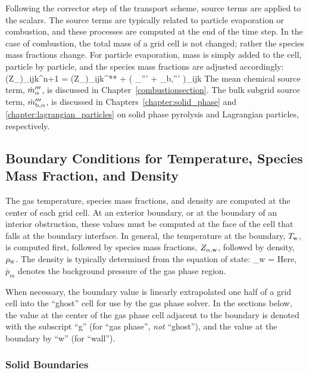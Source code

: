 Following the corrector step of the transport scheme, source terms are applied to the scalars.  The source terms are typically related to particle evaporation or combustion, and these processes are computed at the end of the time step. In the case of combustion, the total mass of a grid cell is not changed; rather the species mass fractions change. For particle evaporation, mass is simply added to the cell, particle by particle, and the species mass fractions are adjusted accordingly:
\be \label{eq:mass_source_terms}
   (\rho Z_\alpha)_{ijk}^{n+1} = (\rho Z_\alpha)_{ijk}^{**} + \dt \left( \dm_{\alpha}''' + \dm_{\rm b,\alpha}''' \right)_{ijk}
\ee
The mean chemical source term, $\dot{m}_{\alpha}'''$, is discussed in Chapter~\ref{combustionsection}.  The bulk subgrid source term, $\dot{m}_{\rm b,\alpha}'''$, is discussed in Chapters~\ref{chapter:solid_phase} and \ref{chapter:lagrangian_particles} on solid phase pyrolysis and Lagrangian particles, respectively.


\subsection{Boundary Conditions for Temperature, Species Mass Fraction, and Density}
\label{section:TZD_bc}

The gas temperature, species mass fractions, and density are computed at the center of each grid cell. At an exterior boundary, or at
the boundary of an interior obstruction, these values must be computed at the face of the cell that falls at the boundary interface. In general, the temperature at the boundary, $T_{\rm w}$, is computed first, followed by species mass fractions, $Z_{\rm \alpha,w}$, followed by density, $\rho_{\rm w}$. The density is typically determined from the equation of state:
\be  \rho_{\rm w} =   \ee
Here, $\overline{p}_m$ denotes the background pressure of the gas phase region.

When necessary, the boundary value is linearly extrapolated one half of a grid cell into the ``ghost'' cell for use by the gas phase solver. In the sections below, the value at the center of the gas phase cell adjacent to the boundary is denoted with the subscript ``g'' (for ``gas phase'', \emph{not} ``ghost''), and the value at the boundary by ``w'' (for ``wall'').

\subsubsection{Solid Boundaries}

